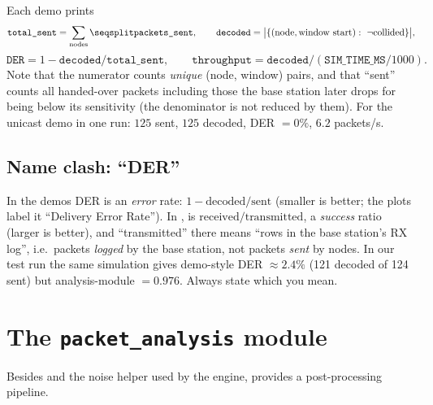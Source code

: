 Each demo prints
\[
 \texttt{total\_sent}=\sum_{\text{nodes}}\codew{packets_sent},\qquad
 \texttt{decoded}=\bigl|\{(\text{node},\text{window start}):\ \neg\text{collided}\}\bigr|,
\]
\[
 \texttt{DER}=1-\texttt{decoded}/\texttt{total\_sent},\qquad
 \texttt{throughput}=\texttt{decoded}/(\texttt{SIM\_TIME\_MS}/1000).
\]
Note that the numerator counts \emph{unique} (node, window) pairs, and that ``sent'' counts all handed-over packets including those the base station later drops for being below its sensitivity (the denominator is not reduced by them). For the unicast demo in one run: $125$ sent, $125$ decoded, DER $=0\%$, $6.2$ packets/s.

\subsection{Name clash: ``DER''}

\begin{reality}
In the demos DER is an \emph{error} rate: $1-\text{decoded}/\text{sent}$ (smaller is better; the plots label it ``Delivery Error Rate''). In ,  is $\text{received}/\text{transmitted}$, a \emph{success} ratio (larger is better), and ``transmitted'' there means ``rows in the base station's RX log'', i.e.\ packets \emph{logged} by the base station, not packets \emph{sent} by nodes. In our test run the same simulation gives demo-style DER $\approx2.4\%$ (121 decoded of 124 sent) but analysis-module $=0.976$. Always state which you mean.
\end{reality}

\section{The \texttt{packet\_analysis} module}
\label{sec:pamodule}

Besides  and the noise helper used by the engine,  provides a post-processing pipeline.

